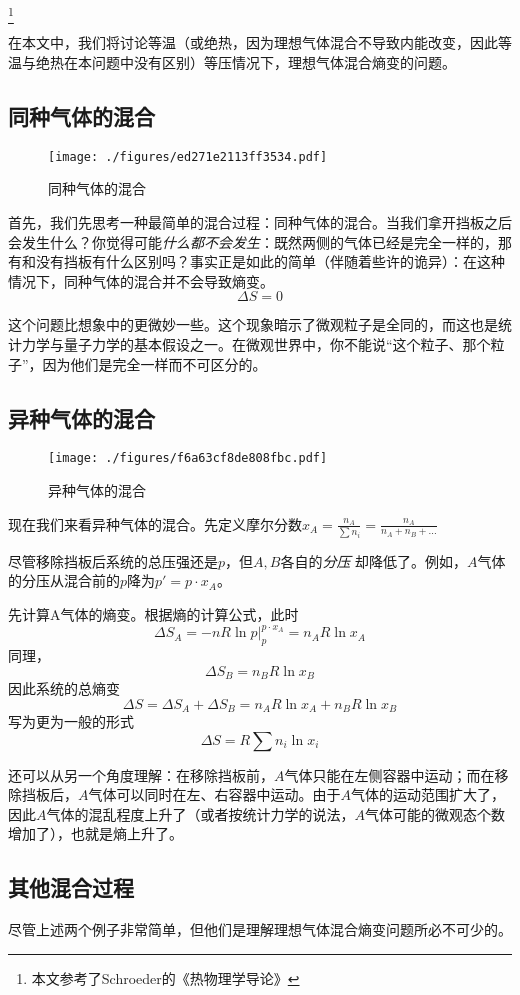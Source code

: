 
\footnote{本文参考了Schroeder的《热物理学导论》}

\begin{issues}
\issueDraft
\end{issues}
在本文中，我们将讨论等温（或绝热，因为理想气体混合不导致内能改变，因此等温与绝热在本问题中没有区别）等压情况下，理想气体混合熵变的问题。

\subsection{同种气体的混合}
\begin{figure}[ht]
\centering
\texttt{[image: ./figures/ed271e2113ff3534.pdf]}
\caption{同种气体的混合} \label{fig_IGME_1}
\end{figure}
首先，我们先思考一种最简单的混合过程：同种气体的混合。当我们拿开挡板之后会发生什么？你觉得可能\textsl{什么都不会发生}：既然两侧的气体已经是完全一样的，那有和没有挡板有什么区别吗？事实正是如此的简单（伴随着些许的诡异）：在这种情况下，同种气体的混合并不会导致熵变。
\begin{equation}
\Delta S = 0
\end{equation}

这个问题比想象中的更微妙一些。这个现象暗示了微观粒子是全同的，而这也是统计力学与量子力学的基本假设之一。在微观世界中，你不能说“这个粒子、那个粒子”，因为他们是完全一样而不可区分的。

\subsection{异种气体的混合}
\begin{figure}[ht]
\centering
\texttt{[image: ./figures/f6a63cf8de808fbc.pdf]}
\caption{异种气体的混合} \label{fig_IGME_fig2}
\end{figure}

现在我们来看异种气体的混合。先定义摩尔分数$x_A = \frac{n_A}{\sum n_i} = \frac{n_A}{n_A+n_B+...}$

尽管移除挡板后系统的总压强还是$p$，但$A, B$各自的\textsl{分压} 却降低了。例如，$A$气体的分压从混合前的$p$降为$p'=p \cdot x_A$。

先计算A气体的熵变。根据熵的计算公式，此时
$$
\Delta S_A=-nR\ln p |^{p \cdot x_A}_p=n_A R \ln x_A
$$
同理，
$$
\Delta S_B=n_B R \ln x_B
$$
因此系统的总熵变
$$
\Delta S = \Delta S_A+\Delta S_B= n_A R \ln x_A + n_B R \ln x_B
$$
写为更为一般的形式
\begin{equation}
\Delta S = R \sum n_i \ln x_i
\end{equation}

还可以从另一个角度理解：在移除挡板前，$A$气体只能在左侧容器中运动；而在移除挡板后，$A$气体可以同时在左、右容器中运动。由于$A$气体的运动范围扩大了，因此$A$气体的混乱程度上升了（或者按统计力学的说法，$A$气体可能的微观态个数增加了），也就是熵上升了。

\subsection{其他混合过程}
尽管上述两个例子非常简单，但他们是理解理想气体混合熵变问题所必不可少的。
